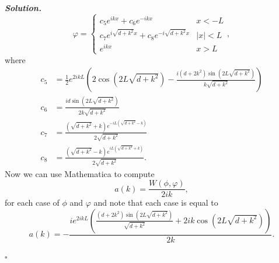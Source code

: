 \documentclass[12pt]{report}
\newenvironment{solution}[1][\it{Solution}]{\textbf{#1. } }{$\square$}
\begin{document}
\begin{solution}
    \[ 
        \varphi =
        \begin{cases}
            c_5 e^{ikx} + c_6 e^{-ikx} &x < -L\\
            c_7e^{i\sqrt{d + k^2}x} + c_8e^{-i\sqrt{d + k^2}x} &|x| < L\\
            e^{ikx} &x > L
        \end{cases},
    \]
    where
    \begin{align*}
        c_5 &= \frac{1}{2} e^{2 i k L} \left(2 \cos \left(2 L \sqrt{d+k^2}\right)-\frac{i \left(d+2 k^2\right) \sin \left(2 L \sqrt{d+k^2}\right)}{k \sqrt{d+k^2}}\right)\\
        c_6 &= \frac{i d \sin \left(2 L \sqrt{d+k^2}\right)}{2 k \sqrt{d+k^2}}\\
        c_7 &= \frac{\left(\sqrt{d+k^2}+k\right) e^{-i L \left(\sqrt{d+k^2}-k\right)}}{2 \sqrt{d+k^2}}\\
        c_8 &=\frac{\left(\sqrt{d+k^2}-k\right) e^{i L \left(\sqrt{d+k^2}+k\right)}}{2 \sqrt{d+k^2}}.
    \end{align*}
    Now we can use Mathematica to compute 
    \[ a(k) = \frac{W(\phi,\varphi)}{2ik},\]
    for each case of $\phi$ and $\varphi$ and note that each case is equal to
    \[ a(k) = -\frac{i e^{2 i k L} \left(\frac{\left(d+2 k^2\right) \sin \left(2 L \sqrt{d+k^2}\right)}{\sqrt{d+k^2}}+2 i k \cos \left(2 L \sqrt{d+k^2}\right)\right)}{2 k}. \]


\end{solution}
\end{document}
